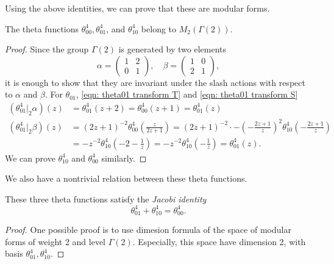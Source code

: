 Using the above identities, we can prove that these are modular forms.
\begin{lemma}\label{lemma-theta-functions-modular-forms}
    The theta functions $\theta^4_{00},\theta^4_{01}$, and $\theta^4_{10}$ belong to $M_2(\Gamma(2))$.
\end{lemma}
\begin{proof}
Since the group $\Gamma(2)$ is generated by two elements
\begin{equation}
    \alpha = \begin{pmatrix}
        1 & 2 \\ 0 & 1
    \end{pmatrix},\quad \beta = \begin{pmatrix}
        1 & 0 \\ 2 & 1
    \end{pmatrix},
\end{equation}
it is enough to show that they are invariant under the slash actions with respect to $\alpha$ and $\beta$.
For $\theta_{01}$, \eqref{eqn: theta01 transform T} and \eqref{eqn: theta01 transform S}
\begin{align}
    (\theta_{01}^{4}|_{2}\alpha)(z) &= \theta_{01}^{4}(z + 2) = \theta_{00}^{4}(z + 1) = \theta_{01}^{4}(z) \\
    (\theta_{01}^{4}|_{2}\beta)(z) &= (2z + 1)^{-2} \theta_{00}^{4}\left(\frac{z}{2z + 1}\right) = (2z + 1)^{-2} \cdot - \left(- \frac{2z + 1}{z}\right)^{2} \theta_{10}^{4} \left(-\frac{2z + 1}{z}\right) \\
    &= -z^{-2} \theta_{10}^{4}\left(-2 - \frac{1}{z}\right)
    = -z^{-2} \theta_{10}^{4}\left(- \frac{1}{z}\right) = \theta_{01}^{4}(z).
\end{align}
We can prove $\theta_{10}^{4}$ and $\theta_{00}^{4}$ similarly.
\end{proof}

We also have a nontrivial relation between these theta functions.
\begin{lemma}\label{lemma-theta-functions-jacobi-identity}
 These three theta functions satisfy the \emph{Jacobi identity}
\begin{equation}
\theta_{01}^4+\theta_{10}^4=\theta_{00}^4.
\end{equation}
\end{lemma}
\begin{proof}
One possible proof is to use dimesion formula of the space of modular forms of weight 2 and level $\Gamma(2)$. Especially, this space have dimension 2, with basis $\theta_{01}^4, \theta_{10}^4$.
\end{proof}

